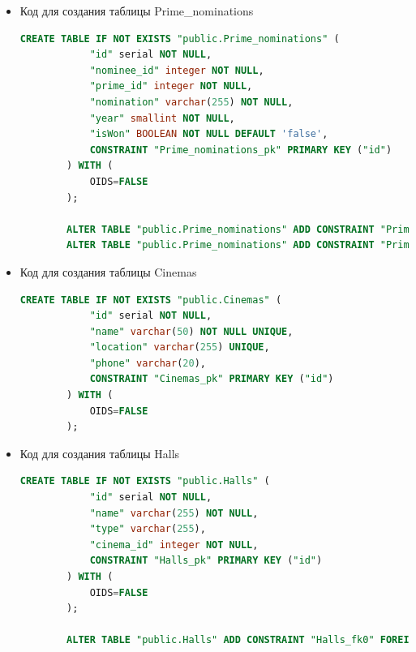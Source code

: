 \documentclass[a4paper,12pt]{article}
\renewcommand{\^}[2]{#1^{\, #2} \kern -1pt}
\newcommand{\1}{\kern 1pt}
\newcommand{\0}{\kern -1pt}
\begin{document}
\begin{itemize}
	\begin{lstlisting}[style=vscode-dark, language=SQL, label={code:sql}]
		CREATE TABLE IF NOT EXISTS "public.Primes" (
			"id" serial NOT NULL,
			"name" varchar(50) NOT NULL UNIQUE,
			CONSTRAINT "Primes_pk" PRIMARY KEY ("id")
		) WITH (
			OIDS=FALSE
		);
	\end{lstlisting}

	\item Код для создания таблицы Prime\_nominations

	\begin{lstlisting}[style=vscode-dark, language=SQL, label={code:sql}]
		CREATE TABLE IF NOT EXISTS "public.Prime_nominations" (
			"id" serial NOT NULL,
			"nominee_id" integer NOT NULL,
			"prime_id" integer NOT NULL,
			"nomination" varchar(255) NOT NULL,
			"year" smallint NOT NULL,
			"isWon" BOOLEAN NOT NULL DEFAULT 'false',
			CONSTRAINT "Prime_nominations_pk" PRIMARY KEY ("id")
		) WITH (
			OIDS=FALSE
		);
		
		ALTER TABLE "public.Prime_nominations" ADD CONSTRAINT "Prime_nominations_fk0" FOREIGN KEY ("nominee_id") REFERENCES "public.Nominees"("id");
		ALTER TABLE "public.Prime_nominations" ADD CONSTRAINT "Prime_nominations_fk1" FOREIGN KEY ("prime_id") REFERENCES "public.Primes"("id");
	\end{lstlisting}
	
	\item Код для создания таблицы Cinemas
	
	\begin{lstlisting}[style=vscode-dark, language=SQL, label={code:sql}]
		CREATE TABLE IF NOT EXISTS "public.Cinemas" (
			"id" serial NOT NULL,
			"name" varchar(50) NOT NULL UNIQUE,
			"location" varchar(255) UNIQUE,
			"phone" varchar(20),
			CONSTRAINT "Cinemas_pk" PRIMARY KEY ("id")
		) WITH (
			OIDS=FALSE
		);
	\end{lstlisting}
	
	\item Код для создания таблицы Halls
	
	\begin{lstlisting}[style=vscode-dark, language=SQL, label={code:sql}]
		CREATE TABLE IF NOT EXISTS "public.Halls" (
			"id" serial NOT NULL,
			"name" varchar(255) NOT NULL,
			"type" varchar(255),
			"cinema_id" integer NOT NULL,
			CONSTRAINT "Halls_pk" PRIMARY KEY ("id")
		) WITH (
			OIDS=FALSE
		);
		
		ALTER TABLE "public.Halls" ADD CONSTRAINT "Halls_fk0" FOREIGN KEY ("cinema_id") REFERENCES "public.Cinemas"("id");
	\end{lstlisting}


\end{itemize}
\end{document}
